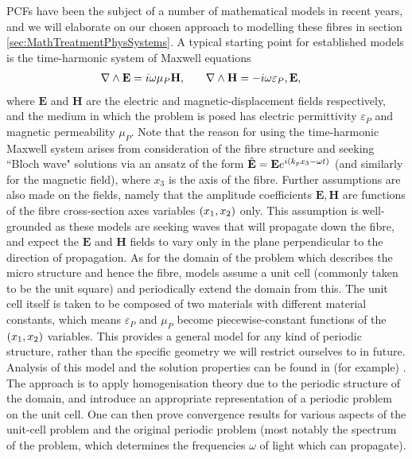 PCFs have been the subject of a number of mathematical models in recent years, and we will elaborate on our chosen approach to modelling these fibres in section \ref{sec:MathTreatmentPhysSystems}. 
A typical starting point for established models is the time-harmonic system of Maxwell equations
\begin{align*}
	\nabla\wedge\mathbf{E} &= i\omega\mu_{P}\mathbf{H}, &\quad \nabla\wedge\mathbf{H} &= -i\omega\varepsilon_{P},\mathbf{E},
\end{align*} 
where $\mathbf{E}$ and $\mathbf{H}$ are the electric and magnetic-displacement fields respectively, and the medium in which the problem is posed has electric permittivity $\varepsilon_{P}$ and magnetic permeability $\mu_{P}$. 
Note that the reason for using the time-harmonic Maxwell system arises from consideration of the fibre structure and seeking ``Bloch wave" solutions via an ansatz of the form $\hat{\mathbf{E}}=\mathbf{E}e^{i\left( k_{p}x_3-\omega t \right)}$ (and similarly for the magnetic field), where $x_3$ is the axis of the fibre.
Further assumptions are also made on the fields, namely that the amplitude coefficients $\mathbf{E},\mathbf{H}$ are functions of the fibre cross-section axes variables $\left( x_1,x_2 \right)$ only.
This assumption is well-grounded as these models are seeking waves that will propagate down the fibre, and expect the $\mathbf{E}$ and $\mathbf{H}$ fields to vary only in the plane perpendicular to the direction of propagation.
As for the domain of the problem which describes the micro structure and hence the fibre, models assume a unit cell (commonly taken to be the unit square) and periodically extend the domain from this.
The unit cell itself is taken to be composed of two materials with different material constants, which means $\varepsilon_{P}$ and $\mu_{P}$ become piecewise-constant functions of the $\left( x_1,x_2 \right)$ variables.
This provides a general model for any kind of periodic structure, rather than the specific geometry we will restrict ourselves to in future.
Analysis of this model and the solution properties can be found in (for example) \cite{cooper2014bandgaps}.
The approach is to apply homogenisation theory due to the periodic structure of the domain, and introduce an appropriate representation of a periodic problem on the unit cell.
One can then prove convergence results for various aspects of the unit-cell problem and the original periodic problem (most notably the spectrum of the problem, which determines the frequencies $\omega$ of light which can propagate). \newline

